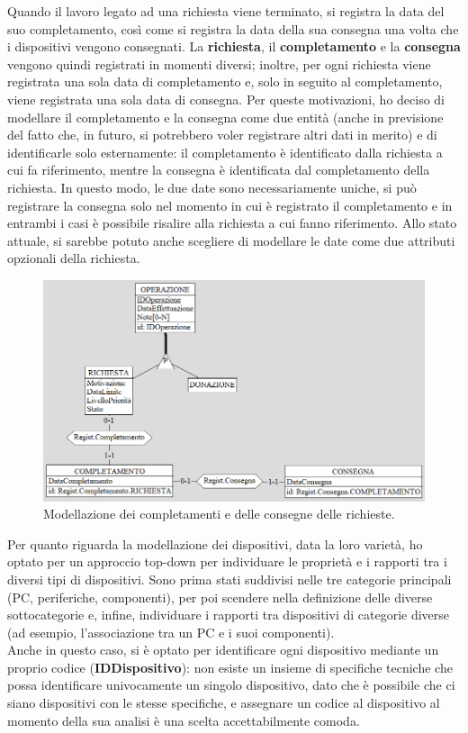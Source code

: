 \documentclass[a4paper,12pt]{report}
\begin{document}
\noindent Quando il lavoro legato ad una richiesta viene terminato, si registra la data del suo completamento, così come si registra la data della sua consegna una volta che i dispositivi vengono consegnati. La \textbf{richiesta}, il \textbf{completamento} e la \textbf{consegna} vengono quindi registrati in momenti diversi; inoltre, per ogni richiesta viene registrata una sola data di completamento e, solo in seguito al completamento, viene registrata una sola data di consegna. Per queste motivazioni, ho deciso di modellare il completamento e la consegna come due entità (anche in previsione del fatto che, in futuro, si potrebbero voler registrare altri dati in merito) e di identificarle solo esternamente: il completamento è identificato dalla richiesta a cui fa riferimento, mentre la consegna è identificata dal completamento della richiesta. In questo modo, le due date sono necessariamente uniche, si può registrare la consegna solo nel momento in cui è registrato il completamento e in entrambi i casi è possibile risalire alla richiesta a cui fanno riferimento. Allo stato attuale, si sarebbe potuto anche scegliere di modellare le date come due attributi opzionali della richiesta.

\begin{figure}[H]
	\centering
	\includegraphics[width=\textwidth]{images/date.png}
    \caption{Modellazione dei completamenti e delle consegne delle richieste.}
	\label{images:date}
\end{figure}

\noindent Per quanto riguarda la modellazione dei dispositivi, data la loro varietà, ho optato per un approccio top-down per individuare le proprietà e i rapporti tra i diversi tipi di dispositivi. Sono prima stati suddivisi nelle tre categorie principali (PC, periferiche, componenti), per poi scendere nella definizione delle diverse sottocategorie e, infine, individuare i rapporti tra dispositivi di categorie diverse (ad esempio, l'associazione tra un PC e i suoi componenti).
\\
Anche in questo caso, si è optato per identificare ogni dispositivo mediante un proprio codice (\textbf{IDDispositivo}): non esiste un insieme di specifiche tecniche che possa identificare univocamente un singolo dispositivo, dato che è possibile che ci siano dispositivi con le stesse specifiche, e assegnare un codice al dispositivo al momento della sua analisi è una scelta accettabilmente comoda.
\end{document}
